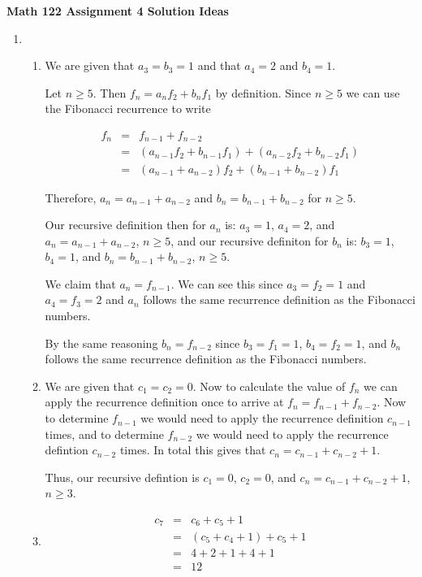 \documentclass[11 pt]{article}%
\begin{document}
\textbf{{Math 122 Assignment 4 Solution Ideas}}



\begin{enumerate}
\item 

 \begin{enumerate}
\item 
We are given that $a_3 = b_3 =1$ and that $a_4 = 2$ and $b_4 = 1$. 

Let $n\geq 5$. Then $f_n = a_n f_2 + b_n f_1$ by definition. Since $n\geq 5$ we can use the Fibonacci recurrence to write

\begin{eqnarray*}
f_n & = & f_{n-1} + f_{n-2} \\
 & = & (a_{n-1} f_2 + b_{n-1} f_1) + (a_{n-2} f_2 + b_{n-2} f_1) \\
 & = & (a_{n-1} + a_{n-2}) f_2 + (b_{n-1} + b_{n-2}) f_1
 \end{eqnarray*}
 
Therefore, $a_n = a_{n-1} + a_{n-2}$ and $b_n = b_{n-1} + b_{n-2}$ for $n\geq 5$. 

Our recursive definition then for $a_n$ is: $a_3 = 1$, $a_4 = 2$, and $a_n = a_{n-1} + a_{n-2}$, $n\geq 5$,
and our recursive definiton for $b_n$ is: $b_3 = 1$, $b_4 = 1$, and $b_n = b_{n-1} + b_{n-2}$, $n\geq 5$.

\bigskip

We claim that $a_n = f_{n-1}$. We can see this since $a_3 = f_2 =1$ and $a_4 = f_3 = 2$ and $a_n$ follows the same recurrence definition as the Fibonacci numbers.

By the same reasoning $b_n = f_{n-2}$ since $b_3 = f_1 = 1$, $b_4 = f_2 = 1$, and $b_n$ follows the same recurrence definition as the Fibonacci numbers.


\item 
We are given that $c_1 = c_2 = 0$. Now to calculate the value of $f_n$ we can apply the recurrence definition once to arrive at $f_n = f_{n-1} + f_{n-2}$. Now to determine $f_{n-1}$ we would need to apply the recurrence definition $c_{n-1}$ times, and to determine $f_{n-2}$ we would need to apply the recurrence defintion $c_{n-2}$ times. In total this gives that $c_n = c_{n-1} + c_{n-2} + 1$. 

Thus, our recursive defintion is $c_1 = 0$, $c_2 = 0$, and $c_n = c_{n-1} + c_{n-2} + 1$, $n\geq 3$.  

\item 
\begin{eqnarray*}
c_7 & = & c_6 + c_5 + 1 \\
 & = & (c_5 + c_4 + 1) + c_5 + 1 \\
 & = & 4 + 2 + 1 + 4 + 1 \\ 
 & = & 12
 \end{eqnarray*}
 

\end{enumerate}
\end{enumerate}
\end{document}
